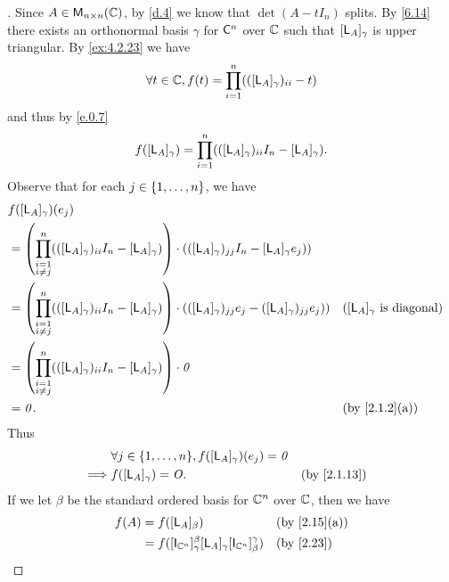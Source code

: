 \begin{proof}[]
	Since \(A \in \mathsf{M}_{{n} \times n}({\mathbb{C}})\), by \cref{d.4} we know that \(\det(A - t I_n)\) splits.
	By \cref{6.14} there exists an orthonormal basis \(\gamma\) for \(\mathsf{C}^n\) over \(\mathbb{C}\) such that \([\mathsf{L}_A]_{\gamma}\) is upper triangular.
	By \cref{ex:4.2.23} we have
	\[
		\forall t \in \mathbb{C}, f(t) = \prod_{i = 1}^n (([\mathsf{L}_A]_{\gamma})_{i i} - t)
	\]
	and thus by \cref{e.0.7}
	\[
		f([\mathsf{L}_A]_{\gamma}) = \prod_{i = 1}^n (([\mathsf{L}_A]_{\gamma})_{i i} I_n - [\mathsf{L}_A]_{\gamma}).
	\]
	Observe that for each \(j \in \left\lbrace1, \dots, n\right\rbrace\), we have
	\begin{align*}
		 & f([\L_A]_{\gamma})(e_j)                         \\
		 & = \pa{\prod_{\substack{i = 1                    \\ i \neq j}}^n (([\L_A]_{\gamma})_{i i} I_n - [\L_A]_{\gamma})} \cdot (([\L_A]_{\gamma})_{j j} I_n - [\L_A]_{\gamma} e_j))         \\
		 & = \pa{\prod_{\substack{i = 1                    \\ i \neq j}}^n (([\L_A]_{\gamma})_{i i} I_n - [\L_A]_{\gamma})} \cdot (([\L_A]_{\gamma})_{j j} e_j - ([\L_A]_{\gamma})_{j j} e_j)) && \text{(\([\L_A]_{\gamma}\) is diagonal)} \\
		 & = \pa{\prod_{\substack{i = 1                    \\ i \neq j}}^n (([\L_A]_{\gamma})_{i i} I_n - [\L_A]_{\gamma})} \cdot \zv \\
		 & = \zv.                       &  & \by{2.1.2}[a]
	\end{align*}
	Thus
	\begin{align*}
		         & \forall j \in \set{1, \dots, n}, f([\L_A]_{\gamma})(e_j) = \zv                  \\
		\implies & f([\L_A]_{\gamma}) = \zm.                                      &  & \by{2.1.13}
	\end{align*}
	If we let \(\beta\) be the standard ordered basis for \(\mathbb{C}^n\) over \(\mathbb{C}\), then we have
	\begin{align*}
		f(A) & = f([\L_A]_{\beta})                                                                                                                                                               &  & \by{2.15}[a]                  \\
		     & = f([\IT[\C^n]]_{\gamma}^{\beta} [\L_A]_{\gamma} [\IT[\C^n]]_{\beta}^{\gamma})                                                                                                    &  & \by{2.23}                     \\

\end{align*}
\end{proof}

